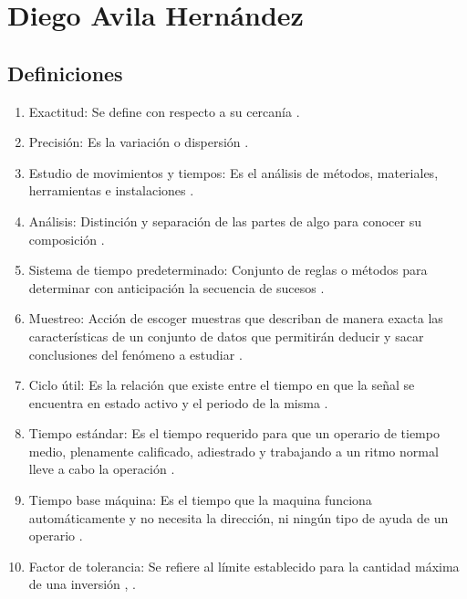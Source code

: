 \section{Diego Avila Hernández}
\subsection{Definiciones}

\begin{enumerate}
    \item Exactitud: Se define con respecto a su cercanía \cite{RAE}.
    \item Precisión: Es la variación o dispersión \cite{RAE}.
    \item Estudio de movimientos y tiempos: Es el análisis de métodos, materiales, herramientas e instalaciones \cite{RAE}.
    \item Análisis: Distinción y separación de las partes de algo para conocer su composición \cite{RAE}.
    \item Sistema de tiempo predeterminado: Conjunto de reglas o métodos para determinar con anticipación la secuencia de sucesos \cite{RAE}.
    \item Muestreo: Acción de escoger muestras que describan de manera exacta las características de un conjunto de datos que permitirán deducir y sacar conclusiones del fenómeno a estudiar \cite{RAE}.
    \item Ciclo útil: Es la relación que existe entre el tiempo en que la señal se encuentra en estado activo y el periodo de la misma \cite{RAE}.
    \item Tiempo estándar: Es el tiempo requerido para que un operario de tiempo medio, plenamente calificado, adiestrado y trabajando a un ritmo normal lleve a cabo la operación \cite{RAE}.
    \item Tiempo base máquina: Es el tiempo que la maquina funciona automáticamente y no necesita la dirección, ni ningún tipo de ayuda de un operario \cite{RAE}.
    \item Factor de tolerancia: Se refiere al límite establecido para la cantidad máxima de una inversión \cite{RAE}, \cite{meyers2000estudios}.
    
    
\end{enumerate}


